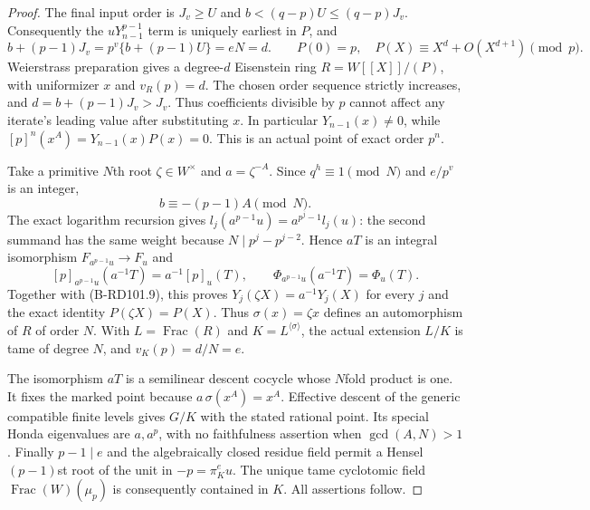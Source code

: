 \begin{proof}
The final input order is $J_v\ge U$ and
$b<(q-p)U\le(q-p)J_v$. Consequently the
$uY_{n-1}^{p-1}$ term is uniquely earliest in $P$, and
\[
 b+(p-1)J_v
   =p^v\{b+(p-1)U\}=eN=d .
 \qquad
 P(0)=p,\quad P(X)\equiv X^d+O(X^{d+1})\pmod p .
                                                        \tag{B-RD101.8}
\]
Weierstrass preparation gives a degree-$d$ Eisenstein
ring $R=W[[X]]/(P)$, with uniformizer $x$ and
$v_R(p)=d$. The chosen order sequence strictly increases,
and $d=b+(p-1)J_v>J_v$. Thus coefficients divisible by
$p$ cannot affect any iterate's leading value after
substituting $x$. In particular
$Y_{n-1}(x)\ne0$, while
$[p]^n(x^A)=Y_{n-1}(x)P(x)=0$.
This is an actual point of exact order $p^n$.

Take a primitive $N$th root $\zeta\in W^\times$ and
$a=\zeta^{-A}$. Since $q^h\equiv1\pmod N$ and
$e/p^v$ is an integer,
\[
                         b\equiv-(p-1)A\pmod N .
                                                        \tag{B-RD101.9}
\]
The exact logarithm recursion gives
$l_j(a^{p-1}u)=a^{p^j-1}l_j(u)$:
the second summand has the same weight because
$N\mid p^j-p^{j-2}$.
Hence $aT$ is an integral isomorphism
$F_{a^{p-1}u}\to F_u$ and
\[
 [p]_{a^{p-1}u}(a^{-1}T)=a^{-1}[p]_u(T),\qquad
 \Phi_{a^{p-1}u}(a^{-1}T)=\Phi_u(T).                  \tag{B-RD101.10}
\]
Together with (B-RD101.9), this proves
$Y_j(\zeta X)=a^{-1}Y_j(X)$ for every $j$ and the
exact identity $P(\zeta X)=P(X)$.
Thus $\sigma(x)=\zeta x$ defines an automorphism of
$R$ of order $N$. With $L=\operatorname{Frac}(R)$
and $K=L^{\langle\sigma\rangle}$, the actual extension
$L/K$ is tame of degree $N$, and $v_K(p)=d/N=e$.

The isomorphism $aT$ is a semilinear descent cocycle
whose $N$fold product is one. It fixes the marked point
because $a\,\sigma(x^A)=x^A$.
Effective descent of the generic compatible finite
levels gives $G/K$ with the stated rational point.
Its special Honda eigenvalues are $a,a^p$, with
no faithfulness assertion when $\gcd(A,N)>1$.
Finally $p-1\mid e$ and the algebraically closed residue
field permit a Hensel $(p-1)$st root of the unit in
$-p=\pi_K^e u$. The unique tame cyclotomic field
$\operatorname{Frac}(W)(\mu_p)$ is consequently
contained in $K$. All assertions follow.
\end{proof}


